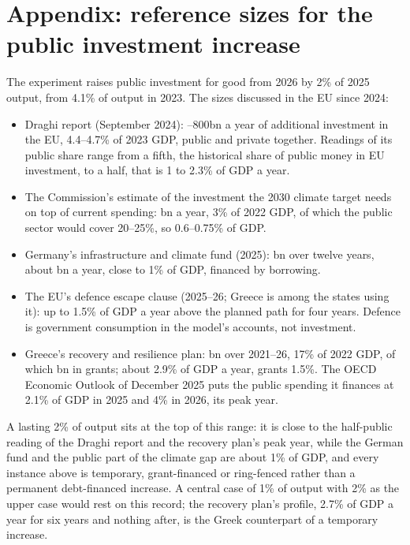 \documentclass[11pt,a4paper]{article}
\newcommand{\EUR}[1]{\texteuro#1}
\begin{document}
\section*{Appendix: reference sizes for the public investment increase}\vspace{-0.2cm}

\noindent\footnotesize
The experiment raises public investment for good from 2026 by 2\% of
2025 output, from 4.1\% of output in 2023. The sizes discussed in the EU since 2024:
\begin{itemize}
\item Draghi report (September 2024): \EUR{750}--800bn a year of additional
  investment in the EU, 4.4--4.7\% of 2023 GDP, public and private
  together. Readings of its public share range from a fifth, the historical
  share of public money in EU investment, to a half, that is 1 to 2.3\% of
  GDP a year.
\item The Commission's estimate of the investment the 2030 climate target
  needs on top of current spending: \EUR{477}bn a year, 3\% of 2022 GDP, of
  which the public sector would cover 20--25\%, so 0.6--0.75\% of GDP.
\item Germany's infrastructure and climate fund (2025): \EUR{500}bn over
  twelve years, about \EUR{42}bn a year, close to 1\% of GDP, financed by
  borrowing.
\item The EU's defence escape clause (2025--26; Greece is among the states
  using it): up to 1.5\% of GDP a year above the planned path for four
  years. Defence is government consumption in the model's accounts, not
  investment.
\item Greece's recovery and resilience plan: \EUR{36}bn over 2021--26, 17\%
  of 2022 GDP, of which \EUR{18.2}bn in grants; about 2.9\% of GDP a year,
  grants 1.5\%. The OECD Economic Outlook of December 2025 puts the public
  spending it finances at 2.1\% of GDP in 2025 and 4\% in 2026, its peak
  year.
\end{itemize}
A lasting 2\% of output sits at the top of this range: it is close to the
half-public reading of the Draghi report and the recovery plan's peak year,
while the German fund and the public part of the climate gap are about 1\%
of GDP, and every instance above is temporary, grant-financed or
ring-fenced rather than a permanent debt-financed increase. A central case
of 1\% of output with 2\% as the upper case would rest on this record; the
recovery plan's profile, 2.7\% of GDP a year for six years and nothing
after, is the Greek counterpart of a temporary increase.
\end{document}

